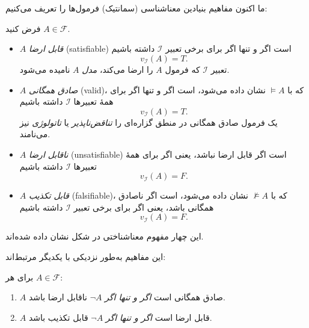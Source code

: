 \section*{ }

    ما اکنون مفاهیم بنیادین معناشناسی (سمانتیک) فرمول‌ها را تعریف می‌کنیم:

    \begin{definition}[تعریف \lr{2.38}]
      فرض کنید $A \in \mathscr{F}$.
      \begin{itemize}
        \item $A$ \emph{قابل ارضا} (satisfiable) است اگر و تنها اگر برای برخی تعبیر $\mathscr{I}$ داشته باشیم
          \[
            v_{\mathscr{I}}(A) = T.
          \]
          تعبیر $\mathscr{I}$ که فرمول $A$ را ارضا می‌کند، \emph{مدل} $A$ نامیده می‌شود.
        \item $A$ \emph{صادق همگانی} (valid)، که با $\models A$ نشان داده می‌شود، است اگر و تنها اگر برای همهٔ تعبیرها $\mathscr{I}$ داشته باشیم
          \[
            v_{\mathscr{I}}(A) = T.
          \]
          یک فرمول صادق همگانی در منطق گزاره‌ای را \emph{تناقض‌ناپذیر} یا \emph{تاتولوژی} نیز می‌نامند.
        \item $A$ \emph{ناقابل ارضا} (unsatisfiable) است اگر قابل ارضا نباشد، یعنی اگر برای همهٔ تعبیرها $\mathscr{I}$ داشته باشیم
          \[
            v_{\mathscr{I}}(A) = F.
          \]
        \item $A$ \emph{قابل تکذیب} (falsifiable)، که با $\not\models A$ نشان داده می‌شود، است اگر ناصادق همگانی باشد، یعنی اگر برای برخی تعبیر $\mathscr{I}$ داشته باشیم
          \[
            v_{\mathscr{I}}(A) = F.
          \]
      \end{itemize}
      این چهار مفهوم معناشناختی در شکل  نشان داده شده‌اند.
    \end{definition}

    این مفاهیم به‌طور نزدیکی با یکدیگر مرتبط‌اند:

    \begin{theorem}[قضیه \lr{2.39}]
      برای هر $A \in \mathscr{F}$:
      \begin{enumerate}
        \item $A$ صادق همگانی است \emph{اگر و تنها اگر} $\neg A$ ناقابل ارضا باشد.
        \item $A$ قابل ارضا است \emph{اگر و تنها اگر} $\neg A$ قابل تکذیب باشد.
      \end{enumerate}
    \end{theorem}

